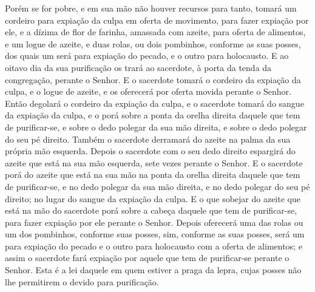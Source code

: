 Porém se for pobre, e em sua mão não houver recursos para tanto,
tomará um cordeiro para expiação da culpa em oferta de movimento,
para fazer expiação por ele, e a dízima de flor de farinha, amassada
com azeite, para oferta de alimentos, e um logue de azeite, e
duas rolas, ou dois pombinhos, conforme as suas posses, dos quais um
será para expiação do pecado, e o outro para holocausto. E ao
oitavo dia da sua purificação os trará ao sacerdote, à porta da
tenda da congregação, perante o Senhor. E o sacerdote tomará
o cordeiro da expiação da culpa, e o logue de azeite, e os oferecerá
por oferta movida perante o Senhor. Então degolará o cordeiro
da expiação da culpa, e o sacerdote tomará do sangue da expiação da
culpa, e o porá sobre a ponta da orelha direita daquele que tem de
purificar-se, e sobre o dedo polegar da sua mão direita, e sobre o
dedo polegar do seu pé direito. Também o sacerdote derramará
do azeite na palma da sua própria mão esquerda. Depois o
sacerdote com o seu dedo direito espargirá do azeite que está na sua
mão esquerda, sete vezes perante o Senhor. E o sacerdote porá
do azeite que está na sua mão na ponta da orelha direita daquele que
tem de purificar-se, e no dedo polegar da sua mão direita, e no dedo
polegar do seu pé direito; no lugar do sangue da expiação da culpa.
E o que sobejar do azeite que está na mão do sacerdote porá
sobre a cabeça daquele que tem de purificar-se, para fazer expiação
por ele perante o Senhor. Depois oferecerá uma das rolas ou
um dos pombinhos, conforme suas posses, sim, conforme as suas
posses, será um para expiação do pecado e o outro para holocausto
com a oferta de alimentos; e assim o sacerdote fará expiação por
aquele que tem de purificar-se perante o Senhor. Esta é a lei
daquele em quem estiver a praga da lepra, cujas posses não lhe
permitirem o devido para purificação.

